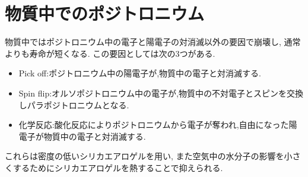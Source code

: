 \section{物質中でのポジトロニウム}

物質中ではポジトロニウム中の電子と陽電子の対消滅以外の要因で崩壊し,
通常よりも寿命が短くなる.
この要因としては次の3つがある.
\begin{itemize}
\item Pick off:ポジトロニウム中の陽電子が,物質中の電子と対消滅する.
\item Spin flip:オルソポジトロニウム中の電子が,物質中の不対電子とスピンを交換しパラポジトロニウムとなる.
\item 化学反応:酸化反応によりポジトロニウムから電子が奪われ,自由になった陽電子が物質中の電子と対消滅する.
\end{itemize}
これらは密度の低いシリカエアロゲルを用い,
また空気中の水分子の影響を小さくするためにシリカエアロゲルを熱することで抑えられる.
